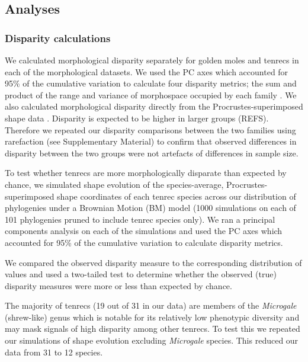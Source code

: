 \documentclass[12pt,a4paper]{article}
\begin{document}
	
\subsection{Analyses}
\subsubsection{Disparity calculations} 

We calculated morphological disparity separately for golden moles and tenrecs in each of the morphological datasets. We used the PC axes which accounted for 95\% of the cumulative variation to calculate four disparity metrics; the sum and product of the range and variance of morphospace occupied by each family \citep{Brusatte2008, Foth2012, Ruta2013}. We also calculated morphological disparity directly from the Procrustes-superimposed shape data \citep{Zelditch2012}. 
Disparity is expected to be higher in larger groups (REFS). Therefore we repeated our disparity comparisons between the two families using rarefaction (see Supplementary Material) to confirm that observed differences in disparity between the two groups were not artefacts of differences in sample size.

To test whether tenrecs are more morphologically disparate than expected by chance, we simulated shape evolution  \citep{Harmon2008} of the species-average, Procrustes-superimposed shape coordinates of each tenrec species across our distribution of phylogenies under a Brownian Motion (BM) model (1000 simulations on each of 101 phylogenies pruned to include tenrec species only). We ran a principal components analysis on each of the simulations and used the PC axes which accounted for 95\% of the cumulative variation to calculate disparity metrics.
 

We compared the observed disparity measure to the corresponding distribution of values and used a two-tailed test to determine whether the observed (true) disparity measures were more or less than expected by chance.

The majority of tenrecs (19 out of 31 in our data) are members of the \textit{Microgale} (shrew-like) genus which is notable for its relatively low phenotypic diversity \citep{ Soarimalala2011, Jenkins2003} and may mask signals of high disparity among other tenrecs. To test this we repeated our simulations of shape evolution excluding \textit{Microgale} species. This reduced our data from 31 to 12 species. 
\end{document}

